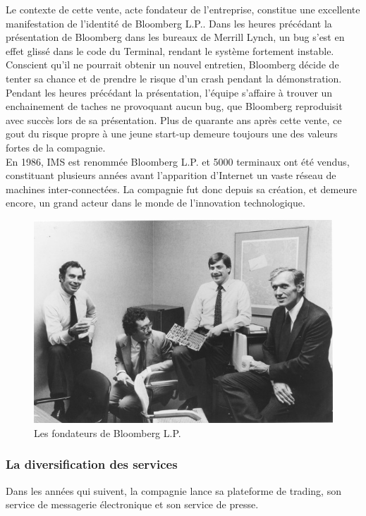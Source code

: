\documentclass[11pt, oneside, titlepage, a4paper]{article}
\begin{document}
Le contexte de cette vente, acte fondateur de l'entreprise, constitue une excellente manifestation de l'identité de Bloomberg L.P.. Dans les heures précédant la présentation de Bloomberg dans les bureaux de Merrill Lynch, un bug s'est en effet glissé dans le code du Terminal, rendant le système fortement instable. Conscient qu'il ne pourrait obtenir un nouvel entretien, Bloomberg décide de tenter sa chance et de prendre le risque d'un crash pendant la démonstration. Pendant les heures précédant la présentation, l'équipe s'affaire à trouver un enchainement de taches ne provoquant aucun bug, que Bloomberg reproduisit avec succès lors de sa présentation. Plus de quarante ans après cette vente, ce gout du risque propre à une jeune start-up demeure toujours une des valeurs fortes de la compagnie.
\\

En 1986, IMS est renommée Bloomberg L.P. et 5000 terminaux ont été vendus, constituant plusieurs années avant l'apparition d'Internet un vaste réseau de machines inter-connectées. La compagnie fut donc depuis sa création, et demeure encore, un grand acteur dans le monde de l'innovation technologique.

\begin{figure}
\begin{center}
\includegraphics[scale=0.37]{creation.jpg}
\caption{Les fondateurs de Bloomberg L.P.}
\end{center}
\end{figure}
		\subsubsection{La diversification des services}
Dans les années qui suivent, la compagnie lance sa plateforme de trading, son service de messagerie électronique et son service de presse.
\\
\end{document}
